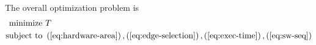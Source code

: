 The overall optimization problem is
\begin{subequations}
    \begin{align}
        \textrm{minimize} & ~ T\\
        \textrm{subject to} & ~ \left(\ref{eq:hardware-area}\right),\left(\ref{eq:edge-selection}\right),\left(\ref{eq:exec-time}\right),\left(\ref{eq:sw-seq}\right)
    \end{align}
\end{subequations}